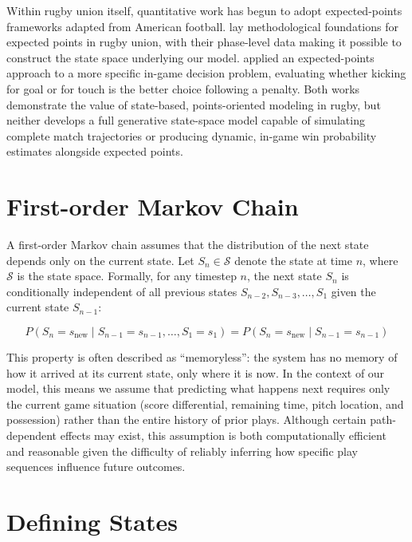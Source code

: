 \documentclass[12pt]{article}
\begin{document}
Within rugby union itself, quantitative work has begun to adopt expected-points frameworks adapted from American football. \citet{Martinez-Arastey2025} lay methodological foundations for expected points in rugby union, with their phase-level data making it possible to construct the state space underlying our model. \citet{WattsPipping2026} applied an expected-points approach to a more specific in-game decision problem, evaluating whether kicking for goal or for touch is the better choice following a penalty. Both works demonstrate the value of state-based, points-oriented modeling in rugby, but neither develops a full generative state-space model capable of simulating complete match trajectories or producing dynamic, in-game win probability estimates alongside expected points.


\section{First-order Markov Chain}

A first-order Markov chain assumes that the distribution of the next state depends only on the current state. Let $S_n \in \mathcal{S}$ denote the state at time $n$, where $\mathcal{S}$ is the state space. Formally, for any timestep $n$, the next state $S_n$ is conditionally independent of all previous states $S_{n-2}, S_{n-3}, \ldots, S_1$ given the current state $S_{n-1}$:

\begin{equation}
P(S_n = s_{\text{new}} \mid S_{n-1} = s_{n-1}, \ldots, S_1 = s_1)
= P(S_n = s_{\text{new}} \mid S_{n-1} = s_{n-1})
\end{equation}

This property is often described as ``memoryless'': the system has no memory of how it arrived at its current state, only where it is now. In the context of our model, this means we assume that predicting what happens next requires only the current game situation (score differential, remaining time, pitch location, and possession) rather than the entire history of prior plays. Although certain path-dependent effects may exist, this assumption is both computationally efficient and reasonable given the difficulty of reliably inferring how specific play sequences influence future outcomes.

\section{Defining States}
\end{document}
